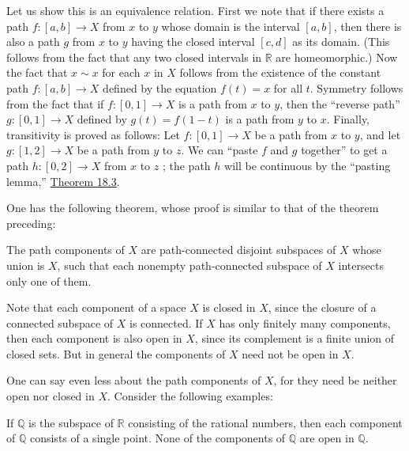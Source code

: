Let us show this is an equivalence relation. First we note that if there exists a path \(f : [ {a,b}] \rightarrow X\) from \(x\) to \(y\) whose domain is the interval \([ {a,b}]\), then there is also a path \(g\) from \(x\) to \(y\) having the closed interval \([ {c,d}]\) as its domain. (This follows from the fact that any two closed intervals in \(\mathbb{R}\) are homeomorphic.) Now the fact that \(x \sim x\) for each \(x\) in \(X\) follows from the existence of the constant path \(f : [ {a,b}] \rightarrow X\) defined by the equation \(f( t) = x\) for all \(t\). Symmetry follows from the fact that if \(f : [ {0,1}] \rightarrow X\) is a path from \(x\) to \(y\), then the ``reverse path'' \(g : [ {0,1}] \rightarrow X\) defined by \(g( t) = f( {1 - t})\) is a path from \(y\) to \(x\). Finally, transitivity is proved as follows: Let \(f : [ {0,1}] \rightarrow X\) be a path from \(x\) to \(y\), and let \(g : [ {1,2}] \rightarrow X\) be a path from \(y\) to \(z\). We can ``paste \(f\) and \(g\) together'' to get a path \(h : [ {0,2}] \rightarrow X\) from \(x\) to \(z\) ; the path \(h\) will be continuous by the ``pasting lemma,'' \hyperref[thm:18.3]{Theorem 18.3}.

One has the following theorem, whose proof is similar to that of the theorem preceding:

\begin{theorem}
\label{thm:\thetheorem}
 The path components of \(X\) are path-connected disjoint subspaces of \(X\) whose union is \(X\), such that each nonempty path-connected subspace of \(X\) intersects only one of them.
\end{theorem}

Note that each component of a space \(X\) is closed in \(X\), since the closure of a connected subspace of \(X\) is connected. If \(X\) has only finitely many components, then each component is also open in \(X\), since its complement is a finite union of closed sets. But in general the components of \(X\) need not be open in \(X\).

One can say even less about the path components of \(X\), for they need be neither open nor closed in \(X\). Consider the following examples:

\begin{centeredblock}
\begin{example}
\label{ex:\thesection.\theexample}
 If \(\mathbb{Q}\) is the subspace of \(\mathbb{R}\) consisting of the rational numbers, then each component of \(\mathbb{Q}\) consists of a single point. None of the components of \(\mathbb{Q}\) are open in \(\mathbb{Q}\).
\end{example}
\end{centeredblock}

